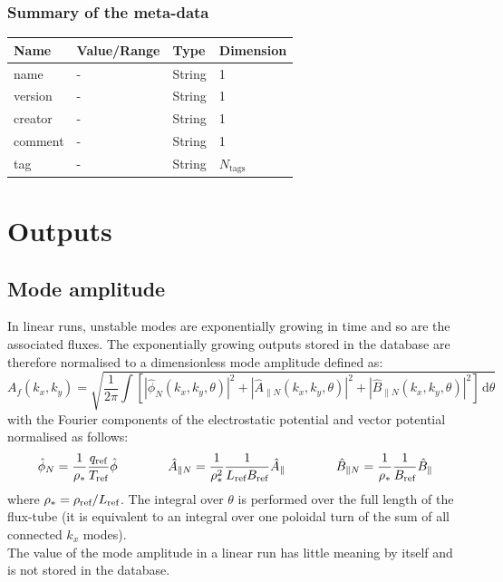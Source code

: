 \documentclass[a4paper]{report}
\begin{document}
\subsection{Summary of the meta-data}
\begin{tabularx}{\textwidth}{|X|Y|Y|Y|}
\hline
Name & Value/Range & Type & Dimension \\
\hline
name &  - & String & 1 \\
version &  - & String & 1 \\
creator &  - & String & 1 \\
comment &  - & String & 1 \\
tag  &  - & String & $N_\textrm{tags}$ \\
\hline
\end{tabularx}


\chapter{Outputs}
\section{Mode amplitude}
In linear runs, unstable modes are exponentially growing in time and so are the associated fluxes. 
The exponentially growing outputs stored in the database are therefore normalised to a dimensionless mode amplitude defined as:
\begin{equation}
 A_f(k_x,k_y) = \sqrt{\frac{1}{2\pi}\left.\int \left[|\hat{\phi}_N(k_x,k_y,\theta)|^2 + |\hat{A}_{\parallel N}(k_x,k_y,\theta)|^2  + |\hat{B}_{\parallel N}(k_x,k_y,\theta)|^2\right] \,\textrm{d}\theta \right.}
\end{equation}
with the Fourier components of the electrostatic potential and vector potential normalised as follows:
\begin{equation}
  \hat{\phi}_N = \frac{1}{\rho_*}\frac{q_{\textrm{ref}}}{T_{\textrm{ref}}} \hat{\phi} \qquad \qquad 
  \hat{A}_{\parallel N}=\frac{1}{\rho_*^2}\frac{1}{L_{\textrm{ref}} B_{\textrm{ref}}} \hat{A}_\parallel \qquad \qquad
  \hat{B}_{\parallel N}=\frac{1}{\rho_*}\frac{1}{B_{\textrm{ref}}} \hat{B}_\parallel
\end{equation}
where $\rho_*=\rho_{\textrm{ref}}/L_{\textrm{ref}}$. The integral over $\theta$ is performed over the full length of the flux-tube (it is equivalent to an integral over one poloidal turn of the sum of all connected $k_x$ modes).\\
The value of the mode amplitude in a linear run has little meaning by itself and is not stored in the database. 
\end{document}
